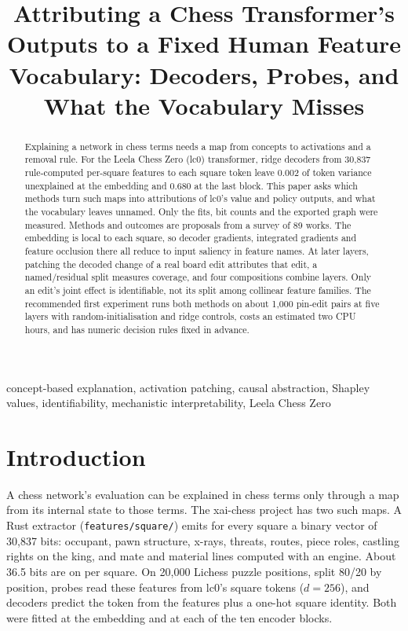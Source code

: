\documentclass[conference]{IEEEtran}
\begin{document}
\title{Attributing a Chess Transformer's Outputs to a Fixed Human Feature Vocabulary: Decoders, Probes, and What the Vocabulary Misses}
\author{}
\maketitle

\begin{abstract}
Explaining a network in chess terms needs a map from concepts to activations and a removal rule. For the Leela Chess Zero (lc0) transformer, ridge decoders from 30,837 rule-computed per-square features to each square token leave 0.002 of token variance unexplained at the embedding and 0.680 at the last block. This paper asks which methods turn such maps into attributions of lc0's value and policy outputs, and what the vocabulary leaves unnamed. Only the fits, bit counts and the exported graph were measured. Methods and outcomes are proposals from a survey of 89 works. The embedding is local to each square, so decoder gradients, integrated gradients and feature occlusion there all reduce to input saliency in feature names. At later layers, patching the decoded change of a real board edit attributes that edit, a named/\allowbreak{}residual split measures coverage, and four compositions combine layers. Only an edit's joint effect is identifiable, not its split among collinear feature families. The recommended first experiment runs both methods on about 1,000 pin-edit pairs at five layers with random-initialisation and ridge controls, costs an estimated two CPU hours, and has numeric decision rules fixed in advance.
\end{abstract}

\begin{IEEEkeywords}
concept-based explanation, activation patching, causal abstraction, Shapley values, identifiability, mechanistic interpretability, Leela Chess Zero
\end{IEEEkeywords}

\section{Introduction}\label{sec:1}
A chess network's evaluation can be explained in chess terms only through a map from its internal state to those terms. The xai-chess project has two such maps. A Rust extractor (\texttt{features/\allowbreak{}square/\allowbreak{}}) emits for every square a binary vector of 30,837 bits: occupant, pawn structure, x-rays, threats, routes, piece roles, castling rights on the king, and mate and material lines computed with an engine. About 36.5 bits are on per square. On 20,000 Lichess puzzle positions, split 80/\allowbreak{}20 by position, probes read these features from lc0's square tokens ($d=256$), and decoders predict the token from the features plus a one-hot square identity. Both were fitted at the embedding and at each of the ten encoder blocks.
\end{document}
